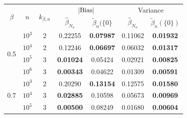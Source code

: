 \documentclass[sn-mathphys-ay]{sn-jnl}%
\begin{document}
\begin{table}[ht!]
    \centering
    \begin{tabular}{|c|c|c|cc|cc|}
        \hline
        \multirow{2}{*}{$\beta$} & \multirow{2}{*}{$n$} & \multirow{2}{*}{$k_{\beta,n}$} & \multicolumn{2}{c|}{\(|\textnormal{Bias}|\)} & \multicolumn{2}{c|}{Variance}                                                            \\
                                 &                      &                                & $\widehat{\beta}_{N_{n}}$                    & $\widetilde{\beta}_n(\{0\}$   & $\widehat{\beta}_{N_{n}}$ & $\widetilde{\beta}_n(\{0\})$ \\ \hline
        \multirow{4}{*}{0.5}     & $10^3$               & 2                              & 0.22255                                      & \textbf{0.07987}              & 0.11062                   & \textbf{0.01932}             \\
                                 & $10^4$               & 2                              & 0.12246                                      & \textbf{0.06697}              & 0.06032                   & \textbf{0.01317}             \\
                                 & $10^5$               & 3                              & \textbf{0.01024}                             & 0.05424                       & 0.02921                   & \textbf{0.00825}             \\
                                 & $10^6$               & 3                              & \textbf{0.00343}                             & 0.04622                       & 0.01309                   & \textbf{0.00591}             \\ \hline
        \multirow{4}{*}{0.7}     & $10^3$               & 2                              & 0.20290                                      & \textbf{0.13154}              & 0.12575                   & \textbf{0.01580}             \\
                                 & $10^4$               & 3                              & \textbf{0.02885}                             & 0.10598                       & 0.05673                   & \textbf{0.00969}             \\
                                 & $10^5$               & 3                              & \textbf{0.00500}                             & 0.08249                       & 0.01680                   & \textbf{0.00604}             \\

\end{tabular}
\end{table}
\end{document}
